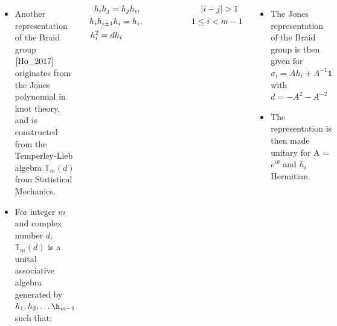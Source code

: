 \documentclass[20pt,,margin=1in,innermargin=-4.5in,blockverticalspace=-0.25in]{tikzposter}
\begin{document}
\begin{columns}
{        \begin{itemize}
            \item Another representation of the Braid group $\cite{Ho_2017}$ originates from the Jones polynomial in knot theory, and is constructed from the Temperley-Lieb algebra $\mathbb{T}_m(d)$ from Statistical Mechanics.
            \item For integer $m$ and complex number $d$,  $\mathbb{T}_m(d)$ is a unital associative algebra generated by $h_1,h_2,\ldots\h_{m-1}$ such that:
        \end{itemize}
        \begin{gather*}
             h_i h_j = h_j h_i, \hspace{2.5cm} |i-j|>1 \\
            h_i h_{i\pm 1} h_i = h_i, \hspace{2.0cm} 1 \leq i < m - 1 \\
            h_i^2 = dh_i \hspace{5.0cm} \\
        \end{gather*}
        \begin{itemize}
            \item The Jones representation of the Braid group is then given for $\sigma_i = Ah_i + A^{-1}\mathbb{1}$
            with $d = -A^2 - A^{-2}$
            \item The representation is then made unitary for A = $e^{i\theta}$ and $h_i$ Hermitian.
        \end{itemize}
    
        \begin{tikzfigure}
        \end{tikzfigure}
   }


\end{columns}
\end{document}
